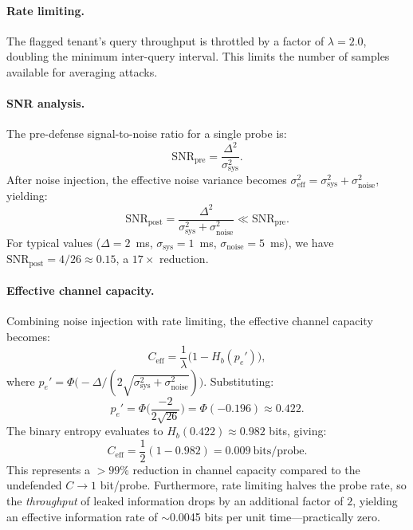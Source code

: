\documentclass[11pt]{article}
\begin{document}
\paragraph{Rate limiting.}
The flagged tenant's query throughput is throttled by a factor of $\lambda = 2.0$,
doubling the minimum inter-query interval. This limits the number of samples available
for averaging attacks.

\paragraph{SNR analysis.}
The pre-defense signal-to-noise ratio for a single probe is:
\begin{equation}
    \mathrm{SNR}_{\mathrm{pre}} = \frac{\Delta^2}{\sigma_{\mathrm{sys}}^2}.
\end{equation}
After noise injection, the effective noise variance becomes
$\sigma_{\mathrm{eff}}^2 = \sigma_{\mathrm{sys}}^2 + \sigma_{\mathrm{noise}}^2$, yielding:
\begin{equation}
    \mathrm{SNR}_{\mathrm{post}} = \frac{\Delta^2}{\sigma_{\mathrm{sys}}^2 + \sigma_{\mathrm{noise}}^2}
    \ll \mathrm{SNR}_{\mathrm{pre}}.
    \label{eq:snr-post}
\end{equation}
For typical values ($\Delta = 2$~ms, $\sigma_{\mathrm{sys}} = 1$~ms,
$\sigma_{\mathrm{noise}} = 5$~ms), we have
$\mathrm{SNR}_{\mathrm{post}} = 4 / 26 \approx 0.15$, a $17\times$ reduction.

\paragraph{Effective channel capacity.}
Combining noise injection with rate limiting, the effective channel capacity becomes:
\begin{equation}
    C_{\mathrm{eff}} = \frac{1}{\lambda}\big(1 - H_b(p_e')\big),
    \label{eq:effective-capacity}
\end{equation}
where $p_e' = \Phi\!\big(-\Delta / (2\sqrt{\sigma_{\mathrm{sys}}^2 + \sigma_{\mathrm{noise}}^2})\big)$.
Substituting:
\begin{equation}
    p_e' = \Phi\!\bigg(\frac{-2}{2\sqrt{26}}\bigg) = \Phi(-0.196) \approx 0.422.
\end{equation}
The binary entropy evaluates to $H_b(0.422) \approx 0.982$ bits, giving:
\begin{equation}
    C_{\mathrm{eff}} = \frac{1}{2}(1 - 0.982) = 0.009~\text{bits/probe}.
\end{equation}
This represents a $>99\%$ reduction in channel capacity compared to the undefended
$C \to 1$ bit/probe. Furthermore, rate limiting halves the probe rate, so the
\emph{throughput} of leaked information drops by an additional factor of $2$, yielding
an effective information rate of $\sim$0.0045 bits per unit time---practically zero.
\end{document}
